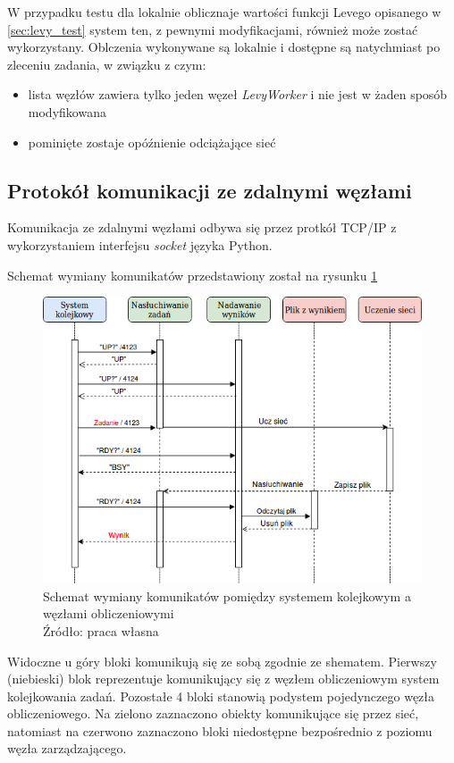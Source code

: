 W przypadku testu dla lokalnie oblicznaje wartości funkcji Levego opisanego w \ref{sec:levy_test} system ten, z pewnymi modyfikacjami, również może zostać wykorzystany.
Oblczenia wykonywane są lokalnie i dostępne są natychmiast po zleceniu zadania, w związku z czym:
\begin{itemize}
  \item lista węzłów zawiera tylko jeden węzeł \textit{LevyWorker} i nie jest w żaden sposób modyfikowana
  \item pominięte zostaje opóźnienie odciążające sieć
\end{itemize}

\subsection{Protokół komunikacji ze zdalnymi węzłami}\label{sec:communication}

Komunikacja ze zdalnymi węzłami odbywa się przez protkół TCP/IP z wykorzystaniem interfejsu \textit{socket} języka Python.

Schemat wymiany komunikatów przedstawiony został na rysunku \ref{fig:komunikacja}
\begin{figure}[h!tb]
	 \centering
	 \includegraphics[width = 1.0\linewidth]{img/komunikacja}
	 \caption{Schemat wymiany komunikatów pomiędzy systemem kolejkowym a węzłami obliczeniowymi \\
              Źródło: praca własna}
	 \label{fig:komunikacja}
\end{figure}

Widoczne u góry bloki komunikują się ze sobą zgodnie ze shematem.
Pierwszy (niebieski) blok reprezentuje komunikujący się z węzłem obliczeniowym system kolejkowania zadań.
Pozostałe 4 bloki stanowią podystem pojedynczego węzła obliczeniowego.
Na zielono zaznaczono obiekty komunikujące się przez sieć, natomiast na czerwono zaznaczono bloki niedostępne bezpośrednio z poziomu węzła zarządzającego.

